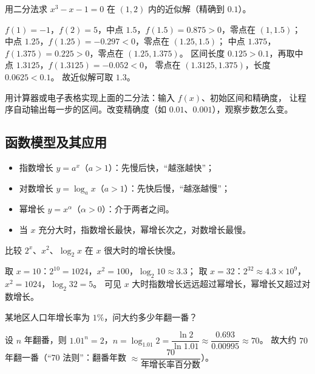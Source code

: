 \begin{explore}
\begin{example}
用二分法求 $x^3-x-1=0$ 在 $(1,2)$ 内的近似解（精确到 $0.1$）。
\end{example}
\begin{solution}
$f(1)=-1$，$f(2)=5$，中点 $1.5$，$f(1.5)=0.875>0$，零点在 $(1,1.5)$；
中点 $1.25$，$f(1.25)=-0.297<0$，零点在 $(1.25,1.5)$；
中点 $1.375$，$f(1.375)=0.225>0$，零点在 $(1.25,1.375)$。
区间长度 $0.125>0.1$，再取中点 $1.3125$，$f(1.3125)=-0.052<0$，
零点在 $(1.3125,1.375)$，长度 $0.0625<0.1$。
故近似解可取 $1.3$。
\end{solution}

用计算器或电子表格实现上面的二分法：输入 $f(x)$、初始区间和精确度，
让程序自动输出每一步的区间。改变精确度（如 $0.01$、$0.001$），观察步数怎么变。

\subsection{函数模型及其应用}

\begin{itemize}
  \item 指数增长 $y=a^x$（$a>1$）：先慢后快，“越涨越快”；
  \item 对数增长 $y=\log_a x$（$a>1$）：先快后慢，“越涨越慢”；
  \item 幂增长 $y=x^{\alpha}$（$\alpha>0$）：介于两者之间。
  \item 当 $x$ 充分大时，指数增长最快，幂增长次之，对数增长最慢。
\end{itemize}

\begin{example}
比较 $2^x$、$x^2$、$\log_2 x$ 在 $x$ 很大时的增长快慢。
\end{example}
\begin{solution}
取 $x=10$：$2^{10}=1024$，$x^2=100$，$\log_2 10\approx3.3$；
取 $x=32$：$2^{32}\approx4.3\times10^9$，$x^2=1024$，$\log_2 32=5$。
可见 $x$ 大时指数增长远远超过幂增长，幂增长又超过对数增长。
\end{solution}

\begin{problem}
某地区人口年增长率为 $1\%$，问大约多少年翻一番？
\end{problem}
\begin{solution}
设 $n$ 年翻番，则 $1.01^n=2$，$n=\log_{1.01}2=\dfrac{\ln2}{\ln1.01}\approx\dfrac{0.693}{0.00995}\approx70$。
故大约 $70$ 年翻一番（“70 法则”：翻番年数 $\approx\dfrac{70}{\text{年增长率百分数}}$）。
\end{solution}


\end{explore}
